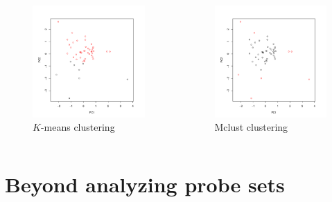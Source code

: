 \begin{frame}
  \begin{columns}
  \begin{column}{0.5\textwidth}
    \begin{figure}
      \centering
      \includegraphics[width=2.5in]{results/kmeans}
      \caption{$K$-means clustering}
      \label{fig:kmeans}
    \end{figure}
  \end{column}

  \begin{column}{0.5\textwidth}
    \begin{figure}
      \centering
      \includegraphics[width=2.5in]{results/mclust}
      \caption{Mclust clustering}
      \label{fig:mclust}
    \end{figure}
  \end{column}
\end{columns}
\end{frame}

\section{Beyond analyzing probe sets}

